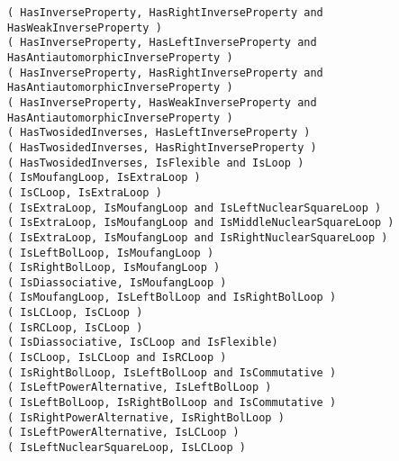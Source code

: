 \documentclass[a4paper,11pt]{report}
\begin{document}
{\texttt{( HasInverseProperty, HasRightInverseProperty and HasWeakInverseProperty )} \\
\texttt{( HasInverseProperty, HasLeftInverseProperty and
HasAntiautomorphicInverseProperty )} \\
\texttt{( HasInverseProperty, HasRightInverseProperty and
HasAntiautomorphicInverseProperty )} \\
\texttt{( HasInverseProperty, HasWeakInverseProperty and
HasAntiautomorphicInverseProperty )} \\
\texttt{( HasTwosidedInverses, HasLeftInverseProperty )} \\
\texttt{( HasTwosidedInverses, HasRightInverseProperty )} \\
\texttt{( HasTwosidedInverses, IsFlexible and IsLoop )} \\
\texttt{( IsMoufangLoop, IsExtraLoop )} \\
\texttt{( IsCLoop, IsExtraLoop )} \\
\texttt{( IsExtraLoop, IsMoufangLoop and IsLeftNuclearSquareLoop )} \\
\texttt{( IsExtraLoop, IsMoufangLoop and IsMiddleNuclearSquareLoop )} \\
\texttt{( IsExtraLoop, IsMoufangLoop and IsRightNuclearSquareLoop )} \\
\texttt{( IsLeftBolLoop, IsMoufangLoop )} \\
\texttt{( IsRightBolLoop, IsMoufangLoop )} \\
\texttt{( IsDiassociative, IsMoufangLoop )} \\
\texttt{( IsMoufangLoop, IsLeftBolLoop and IsRightBolLoop )} \\
\texttt{( IsLCLoop, IsCLoop )} \\
\texttt{( IsRCLoop, IsCLoop )} \\
\texttt{( IsDiassociative, IsCLoop and IsFlexible)} \\
\texttt{( IsCLoop, IsLCLoop and IsRCLoop )} \\
\texttt{( IsRightBolLoop, IsLeftBolLoop and IsCommutative )} \\
\texttt{( IsLeftPowerAlternative, IsLeftBolLoop )} \\
\texttt{( IsLeftBolLoop, IsRightBolLoop and IsCommutative )} \\
\texttt{( IsRightPowerAlternative, IsRightBolLoop )} \\
\texttt{( IsLeftPowerAlternative, IsLCLoop )} \\
\texttt{( IsLeftNuclearSquareLoop, IsLCLoop )} \\
}
\end{document}
